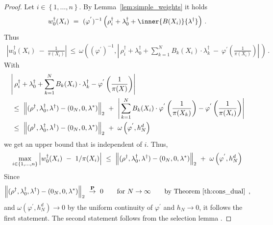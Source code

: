 \begin{proof}
  Let $i\in \left\{ 1,\ldots,n \right\}$.
  By Lemma~\ref{lem:simple_weights}
  it holds
  \begin{align*}
    w_0^\dagger(X_i)
    \ 
    =
    \ 
      (\varphi^{'})^{-1}
      \left( 
        \rho_i^\dagger
        +
        \lambda_0^\dagger
        +
        \inner{B(X_i)}{\lambda^\dagger}
      \right)
      \,.
  \end{align*}
  Thus
  \begin{align}
    \label{4445}
    \left| 
    w_0^\dagger(X_i)
    \ 
    -
    \ 
    \frac{1}{\pi(X_i)}
    \right|
    \
    \le
    \
    \omega
    \left( 
      (\varphi^{'})^{-1}
      ,
      \left| 
      \,
      \rho_i^\dagger
      +
      \lambda_0^\dagger
      +
      \sum_{k=1}^{N} 
      B_k(X_i)\cdot\lambda_k^\dagger
      \ 
      -
      \ 
      \varphi^{'}
      \left( \frac{1}{\pi(X_i)} \right)
      \right|
      \,
    \right)
    \,.
  \end{align}
  With
  \begin{align*}
      &
      \left| 
      \,
      \rho_i^\dagger
      +
      \lambda_0^\dagger
      +
      \sum_{k=1}^{N} 
      B_k(X_i)\cdot\lambda_k^\dagger-
      \varphi^{'}
      \left( \frac{1}{\pi(X)} \right)
      \right|
      \\
      &
      \ 
      \le
      \ 
      \norm{
        (\rho^\dagger,\lambda_0^\dagger,\lambda^\dagger)
        -
        (0_N,0,\lambda^*)
      }_2
      \ 
      +
      \ 
      \left| 
      \,
      \sum_{k=1}^{N} 
      B_k(X_i)\cdot
      \varphi^{'}
      \left( \frac{1}{\pi(X_k)} \right)
      -
      \varphi^{'}
      \left( \frac{1}{\pi(X_i)} \right)
      \right|
      \\
      &
      \ 
      \le
      \ 
      \norm{
        (\rho^\dagger,\lambda_0^\dagger,\lambda^\dagger)
        -
        (0_N,0,\lambda^*)
      }_2
      \ 
      +
      \ 
      \omega
      \left( 
        \varphi^{'},
        h_N^d
      \right)
  \end{align*}
  we get an upper bound that is independent of $i$.
  Thus,
  \begin{align*}
    \max_{i\in \left\{ 1,\ldots,n \right\}}
    \left| 
  w_0^\dagger(X_i)
  \ 
  -
  \ 
  1/\pi(X_i)
    \right|
      \ 
      \le
      \ 
      \norm{
        (\rho^\dagger,\lambda_0^\dagger,\lambda^\dagger)
        -
        (0_N,0,\lambda^*)
      }_2
      \ 
      +
      \ 
      \omega
      \left( 
        \varphi^{'},
        h_N^d
      \right)
  \end{align*}
  Since
  \begin{align*}
      \norm{
        (\rho^\dagger,\lambda_0^\dagger,\lambda^\dagger)
        -
        (0_N,0,\lambda^*)
      }_2
      \ 
      \overset{\P}{\to}
      \ 
      0
      \qquad
      \text{for}
      \ 
      N\to\infty
      \qquad
      \text{by Theorem~\ref{th:cons_dual}
      }
      \,,
  \end{align*}
  and $\omega(\varphi^{'},h_N^d)\to 0$ by the uniform continuity of $\varphi^{'}$ and $h_N\to 0$, 
  it follows the first statement.
The second statement follows from the selection lemma
\cite[A.1.4.]{Steinwart2008}.
  \end{proof}
